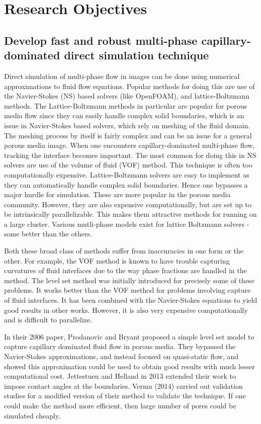 

\section{Research Objectives}


\subsection{ Develop fast and robust multi-phase capillary-dominated direct simulation technique}
	
Direct simulation of multi-phase flow in images can be done using numerical approximations to fluid flow equations. Popular methods for doing this are use of the Navier-Stokes (NS) based solvers (like OpenFOAM), and lattice-Boltzmann methods. The Lattice-Boltzmann methods in particular are popular for porous media flow since they can easily handle complex solid boundaries, which is an issue in Navier-Stokes based solvers, which rely on meshing of the fluid domain. The meshing process by itself is fairly complex and can be an issue for a general porous media image. When one encounters capillary-dominated multi-phase flow, tracking the interface becomes important. The most common for doing this in NS solvers are use of the volume of fluid (VOF) method. This technique is often too computationally expensive. Lattice-Boltzmann solvers are easy to implement as they can automatically handle complex solid boundaries. Hence one bypasses a major hurdle for simulation. These are more popular in the porous media community. However, they are also expensive computationally, but are set up to be intrinsically parallelizable. This makes them attractive methods for running on a large cluster. Various mutli-phase models exist for lattice Boltzmann solvers - some better than the others.

Both these broad class of methods suffer from inaccuracies in one form or the other. For example, the VOF method is known to have trouble capturing curvatures of fluid interfaces due to the way phase fractions are handled in the method. The level set method was initially introduced for precisely some of these problems. It works better than the VOF method for problems involving capture of fluid interfaces. It has been combined with the Navier-Stokes equations to yield good results in other works. However, it is also very expensive computationally and is difficult to parallelize.

In their 2006 paper, Prodanovic and Bryant proposed a simple level set model to capture capillary dominated fluid flow in porous media. They bypassed the Navier-Stokes approximations, and instead focused on quasi-static flow, and showed this approximation could be used to obtain good results with much lesser computational cost. Jettestuen and Helland in 2013 extended their work to impose contact angles at the boundaries. Verma (2014) carried out validation studies for a modified version of their method to validate the technique. If one could make the method more efficient, then large number of pores could be simulated cheaply. 

